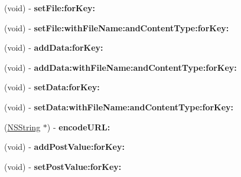 \begin{DoxyCompactItemize}
\item 
\hypertarget{interface_a_s_i_form_data_request_a8b097474a664290880231fd4439f352e}{
(void) -\/ {\bfseries set\-File\-:for\-Key\-:}}
\label{interface_a_s_i_form_data_request_a8b097474a664290880231fd4439f352e}

\item 
\hypertarget{interface_a_s_i_form_data_request_a1b319de7b302e41e0f2b62b04efd4976}{
(void) -\/ {\bfseries set\-File\-:with\-File\-Name\-:and\-Content\-Type\-:for\-Key\-:}}
\label{interface_a_s_i_form_data_request_a1b319de7b302e41e0f2b62b04efd4976}

\item 
\hypertarget{interface_a_s_i_form_data_request_abeb27ef3dc358d5e0a27ba3a077a6653}{
(void) -\/ {\bfseries add\-Data\-:for\-Key\-:}}
\label{interface_a_s_i_form_data_request_abeb27ef3dc358d5e0a27ba3a077a6653}

\item 
\hypertarget{interface_a_s_i_form_data_request_a8ea88f81e036a80e7e7b7f9af04ac421}{
(void) -\/ {\bfseries add\-Data\-:with\-File\-Name\-:and\-Content\-Type\-:for\-Key\-:}}
\label{interface_a_s_i_form_data_request_a8ea88f81e036a80e7e7b7f9af04ac421}

\item 
\hypertarget{interface_a_s_i_form_data_request_a707a5cef615835146cdbed3ceca31016}{
(void) -\/ {\bfseries set\-Data\-:for\-Key\-:}}
\label{interface_a_s_i_form_data_request_a707a5cef615835146cdbed3ceca31016}

\item 
\hypertarget{interface_a_s_i_form_data_request_abbcca0f83bbe93f0132094a99a274098}{
(void) -\/ {\bfseries set\-Data\-:with\-File\-Name\-:and\-Content\-Type\-:for\-Key\-:}}
\label{interface_a_s_i_form_data_request_abbcca0f83bbe93f0132094a99a274098}

\item 
\hypertarget{interface_a_s_i_form_data_request_ab8c6677cbdb0cd4bf7660b79e5afa334}{
(\hyperlink{class_n_s_string}{\-N\-S\-String} $\ast$) -\/ {\bfseries encode\-U\-R\-L\-:}}
\label{interface_a_s_i_form_data_request_ab8c6677cbdb0cd4bf7660b79e5afa334}

\item 
\hypertarget{interface_a_s_i_form_data_request_af9571a143a9feeb009c33c458447aa98}{
(void) -\/ {\bfseries add\-Post\-Value\-:for\-Key\-:}}
\label{interface_a_s_i_form_data_request_af9571a143a9feeb009c33c458447aa98}

\item 
\hypertarget{interface_a_s_i_form_data_request_a90236e7099afbab72bb160029df5a368}{
(void) -\/ {\bfseries set\-Post\-Value\-:for\-Key\-:}}
\label{interface_a_s_i_form_data_request_a90236e7099afbab72bb160029df5a368}


\end{DoxyCompactItemize}
